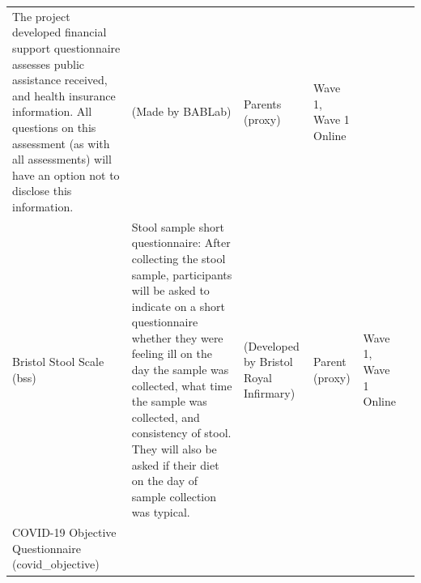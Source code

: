 \documentclass[]{book}
\begin{document}
\begin{longtable}[]{@{}llllll@{}}
\begin{minipage}[t]{0.18\columnwidth}
The project developed financial support questionnaire assesses public assistance received, and health insurance information. All questions on this assessment (as with all assessments) will have an option not to disclose this information.\strut
\end{minipage} & \begin{minipage}[t]{0.15\columnwidth}\raggedright
(Made by BABLab)\strut
\end{minipage} & \begin{minipage}[t]{0.16\columnwidth}\raggedright
Parents (proxy)\strut
\end{minipage} & \begin{minipage}[t]{0.06\columnwidth}\raggedright
Wave 1, Wave 1 Online\strut
\end{minipage} & \begin{minipage}[t]{0.10\columnwidth}\raggedright
\strut
\end{minipage}\tabularnewline
\begin{minipage}[t]{0.18\columnwidth}\raggedright
Bristol Stool Scale (bss)\strut
\end{minipage} & \begin{minipage}[t]{0.18\columnwidth}\raggedright
Stool sample short questionnaire: After collecting the stool sample, participants will be asked to indicate on a short questionnaire whether they were feeling ill on the day the sample was collected, what time the sample was collected, and consistency of stool. They will also be asked if their diet on the day of sample collection was typical.\strut
\end{minipage} & \begin{minipage}[t]{0.15\columnwidth}\raggedright
(Developed by Bristol Royal Infirmary)\strut
\end{minipage} & \begin{minipage}[t]{0.16\columnwidth}\raggedright
Parent (proxy)\strut
\end{minipage} & \begin{minipage}[t]{0.06\columnwidth}\raggedright
Wave 1, Wave 1 Online\strut
\end{minipage} & \begin{minipage}[t]{0.10\columnwidth}\raggedright
\strut
\end{minipage}\tabularnewline
\begin{minipage}[t]{0.18\columnwidth}\raggedright
COVID-19 Objective Questionnaire (covid\_objective)\strut
\end{minipage} & \begin{minipage}[t]{0.18\columnwidth}\raggedright

\end{minipage}
\end{longtable}
\end{document}
